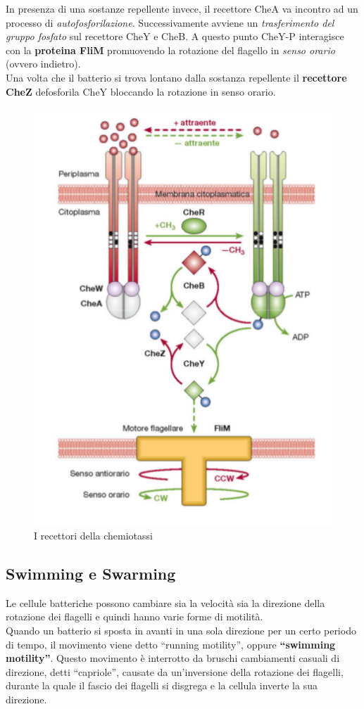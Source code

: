 \documentclass[11pt]{book}
\begin{document}
\vspace{1em}
In presenza di una sostanze repellente invece, il recettore CheA va incontro ad un processo di \emph{autofosforilazione}. Successivamente avviene un \emph{trasferimento del gruppo fosfato} sul recettore CheY e CheB. A questo punto CheY-P interagisce con la \textbf{proteina FliM} promuovendo la rotazione del flagello in \emph{senso orario} (ovvero indietro).\\
Una volta che il batterio si trova lontano dalla sostanza repellente il \textbf{recettore CheZ} defosforila CheY bloccando la rotazione in senso orario.

\clearpage
\begin{figure}[htp]
\centering
\includegraphics[scale=0.5]{img/Recettori chemiotassi.png}
\caption{I recettori della chemiotassi}
\label{}
\end{figure}

\subsection{Swimming e Swarming}

Le cellule batteriche possono cambiare sia la velocità sia la direzione della rotazione dei flagelli e quindi hanno varie forme di motilità.\\
Quando un batterio si sposta in avanti in una sola direzione per un certo periodo di tempo, il movimento viene detto ``running motility'', oppure \textbf{``swimming motility''}. Questo movimento è interrotto da bruschi cambiamenti casuali di direzione, detti ``capriole'', causate da un'inversione della rotazione dei flagelli, durante la quale il fascio dei flagelli si disgrega e la cellula inverte la sua direzione.
\end{document}
